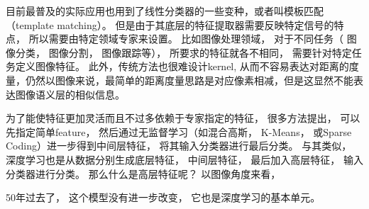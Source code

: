 目前最普及的实际应用也用到了线性分类器的一些变种，或者叫模板匹配（template matching）。 但是由于其底层的特征提取器需要反映特定信号的特点， 所以需要由特定领域专家来设置。 比如图像处理领域， 对于不同任务（ 图像分类， 图像分割， 图像跟踪等）， 所要求的特征就各不相同， 需要针对特定任务定义图像特征。 此外，传统方法也很难设计kernel, 从而不容易表达对距离的度量，仍然以图像来说，最简单的距离度量思路是对应像素相减，但是这显然不能表达图像语义层的相似信息。

为了能使特征更加灵活而且不过多依赖于专家指定的特征， 很多方法提出， 可以先指定简单feature， 然后通过无监督学习（如混合高斯， K-Means， 或Sparse Coding）进一步得到中间层特征， 将其输入分类器进行最后分类。 与其类似， 深度学习也是从数据分别生成底层特征， 中间层特征， 最后加入高层特征， 输入分类器进行分类。 那么什么是高层特征呢？ 以图像角度来看， 




 50年过去了， 这个模型没有进一步改变， 它也是深度学习的基本单元。 






